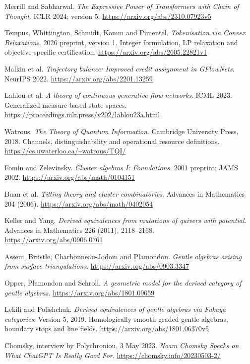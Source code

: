 \begin{description}[style=nextline,leftmargin=1cm]
\item[R5] Merrill and Sabharwal. \emph{The Expressive Power of Transformers with Chain of Thought}. ICLR 2024; version 5. \url{https://arxiv.org/abs/2310.07923v5}
\item[R6] Tempus, Whittington, Schmidt, Komm and Pimentel. \emph{Tokenisation via Convex Relaxations}. 2026 preprint, version 1. Integer formulation, LP relaxation and objective-specific certification. \url{https://arxiv.org/abs/2605.22821v1}
\item[R7] Malkin et al. \emph{Trajectory balance: Improved credit assignment in GFlowNets}. NeurIPS 2022. \url{https://arxiv.org/abs/2201.13259}
\item[R8] Lahlou et al. \emph{A theory of continuous generative flow networks}. ICML 2023. Generalized measure-based state spaces. \url{https://proceedings.mlr.press/v202/lahlou23a.html}
\item[R9] Watrous. \emph{The Theory of Quantum Information}. Cambridge University Press, 2018. Channels, distinguishability and operational resource definitions. \url{https://cs.uwaterloo.ca/~watrous/TQI/}
\item[R10] Fomin and Zelevinsky. \emph{Cluster algebras I: Foundations}. 2001 preprint; JAMS 2002. \url{https://arxiv.org/abs/math/0104151}
\item[R11] Buan et al. \emph{Tilting theory and cluster combinatorics}. Advances in Mathematics 204 (2006). \url{https://arxiv.org/abs/math/0402054}
\item[R12] Keller and Yang. \emph{Derived equivalences from mutations of quivers with potential}. Advances in Mathematics 226 (2011), 2118--2168. \url{https://arxiv.org/abs/0906.0761}
\item[R13] Assem, Br\"ustle, Charbonneau-Jodoin and Plamondon. \emph{Gentle algebras arising from surface triangulations}. \url{https://arxiv.org/abs/0903.3347}
\item[R14] Opper, Plamondon and Schroll. \emph{A geometric model for the derived category of gentle algebras}. \url{https://arxiv.org/abs/1801.09659}
\item[R15] Lekili and Polishchuk. \emph{Derived equivalences of gentle algebras via Fukaya categories}. Version 5, 2019. Homologically smooth graded gentle algebras, boundary stops and line fields. \url{https://arxiv.org/abs/1801.06370v5}
\item[R16] Chomsky, interview by Polychroniou, 3 May 2023. \emph{Noam Chomsky Speaks on What ChatGPT Is Really Good For}. \url{https://chomsky.info/20230503-2/}

\end{description}
